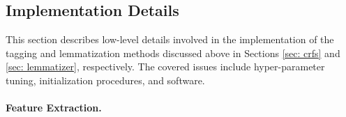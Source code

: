 \documentclass[smallextended]{svjour3}       %
\begin{document}

 
 
\subsection{Implementation Details}
\label{sec: toolkit}

This section describes low-level details involved in the implementation of the tagging and lemmatization methods discussed above in Sections \ref{sec: crfs} and \ref{sec: lemmatizer}, respectively. The covered issues include hyper-parameter tuning, initialization procedures, and software. 

\paragraph{Feature Extraction.}
\end{document}
